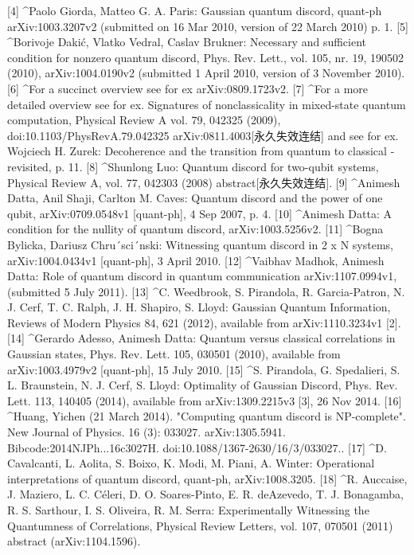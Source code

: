 [4]
^Paolo Giorda, Matteo G. A. Paris: Gaussian quantum discord, quant-ph arXiv:1003.3207v2 (submitted on 16 Mar 2010, version of 22 March 2010) p. 1.
[5]
^Borivoje Dakić, Vlatko Vedral, Caslav Brukner: Necessary and sufficient condition for nonzero quantum discord, Phys. Rev. Lett., vol. 105, nr. 19, 190502 (2010), arXiv:1004.0190v2 (submitted 1 April 2010, version of 3 November 2010).
[6]
^For a succinct overview see for ex arXiv:0809.1723v2.
[7]
^For a more detailed overview see for ex. Signatures of nonclassicality in mixed-state quantum computation, Physical Review A vol. 79, 042325 (2009), doi:10.1103/PhysRevA.79.042325 arXiv:0811.4003[永久失效连结] and see for ex. Wojciech H. Zurek: Decoherence and the transition from quantum to classical - revisited, p. 11.
[8]
^Shunlong Luo: Quantum discord for two-qubit systems, Physical Review A, vol. 77, 042303 (2008) abstract[永久失效连结].
[9]
^Animesh Datta, Anil Shaji, Carlton M. Caves: Quantum discord and the power of one qubit, arXiv:0709.0548v1 [quant-ph], 4 Sep 2007, p. 4.
[10]
^Animesh Datta: A condition for the nullity of quantum discord, arXiv:1003.5256v2.
[11]
^Bogna Bylicka, Dariusz Chru´sci´nski: Witnessing quantum discord in 2 x N systems, arXiv:1004.0434v1 [quant-ph], 3 April 2010.
[12]
^Vaibhav Madhok, Animesh Datta: Role of quantum discord in quantum communication arXiv:1107.0994v1, (submitted 5 July 2011).
[13]
^C. Weedbrook, S. Pirandola, R. Garcia-Patron, N. J. Cerf, T. C. Ralph, J. H. Shapiro, S. Lloyd: Gaussian Quantum Information, Reviews of Modern Physics 84, 621 (2012), available from arXiv:1110.3234v1 [2].
[14]
^Gerardo Adesso, Animesh Datta: Quantum versus classical correlations in Gaussian states, Phys. Rev. Lett. 105, 030501 (2010), available from arXiv:1003.4979v2 [quant-ph], 15 July 2010.
[15]
^S. Pirandola, G. Spedalieri, S. L. Braunstein, N. J. Cerf, S. Lloyd: Optimality of Gaussian Discord, Phys. Rev. Lett. 113, 140405 (2014), available from arXiv:1309.2215v3 [3], 26 Nov 2014.
[16]
^Huang, Yichen (21 March 2014). "Computing quantum discord is NP-complete". New Journal of Physics. 16 (3): 033027. arXiv:1305.5941. Bibcode:2014NJPh...16c3027H. doi:10.1088/1367-2630/16/3/033027..
[17]
^D. Cavalcanti, L. Aolita, S. Boixo, K. Modi, M. Piani, A. Winter: Operational interpretations of quantum discord, quant-ph, arXiv:1008.3205.
[18]
^R. Auccaise, J. Maziero, L. C. Céleri, D. O. Soares-Pinto, E. R. deAzevedo, T. J. Bonagamba, R. S. Sarthour, I. S. Oliveira, R. M. Serra: Experimentally Witnessing the Quantumness of Correlations, Physical Review Letters, vol. 107, 070501 (2011) abstract (arXiv:1104.1596).
